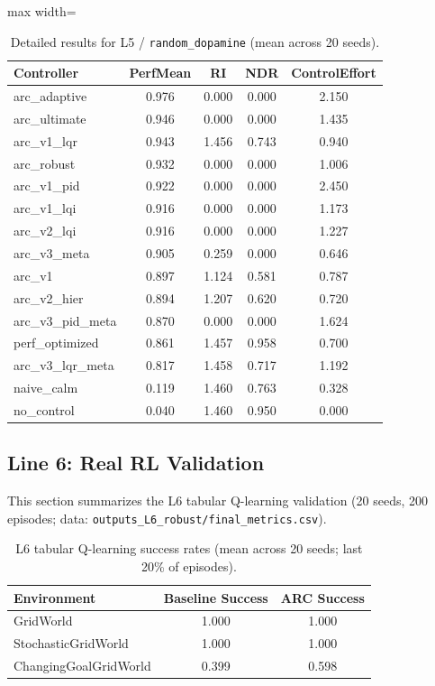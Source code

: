 \documentclass{article}
\begin{document}
\begin{table}[H]
\centering
\footnotesize
\caption{Detailed results for L5 / \texttt{random\_dopamine} (mean across 20 seeds).}
\label{tab:g11_random_dopamine}
\begin{adjustbox}{max width=\textwidth}
\begin{tabular}{@{}lcccc@{}}
\toprule
Controller & PerfMean & RI & NDR & ControlEffort \\ \midrule
arc\_adaptive & 0.976 & 0.000 & 0.000 & 2.150 \\
arc\_ultimate & 0.946 & 0.000 & 0.000 & 1.435 \\
arc\_v1\_lqr & 0.943 & 1.456 & 0.743 & 0.940 \\
arc\_robust & 0.932 & 0.000 & 0.000 & 1.006 \\
arc\_v1\_pid & 0.922 & 0.000 & 0.000 & 2.450 \\
arc\_v1\_lqi & 0.916 & 0.000 & 0.000 & 1.173 \\
arc\_v2\_lqi & 0.916 & 0.000 & 0.000 & 1.227 \\
arc\_v3\_meta & 0.905 & 0.259 & 0.000 & 0.646 \\
arc\_v1 & 0.897 & 1.124 & 0.581 & 0.787 \\
arc\_v2\_hier & 0.894 & 1.207 & 0.620 & 0.720 \\
arc\_v3\_pid\_meta & 0.870 & 0.000 & 0.000 & 1.624 \\
perf\_optimized & 0.861 & 1.457 & 0.958 & 0.700 \\
arc\_v3\_lqr\_meta & 0.817 & 1.458 & 0.717 & 1.192 \\
naive\_calm & 0.119 & 1.460 & 0.763 & 0.328 \\
no\_control & 0.040 & 1.460 & 0.950 & 0.000 \\ \bottomrule
\end{tabular}
\end{adjustbox}
\end{table}

\FloatBarrier
\subsection{Line 6: Real RL Validation}

This section summarizes the L6 tabular Q-learning validation (20 seeds, 200 episodes; data: \texttt{outputs\_L6\_robust/final\_metrics.csv}).

\begin{table}[H]
\centering
\footnotesize
\caption{L6 tabular Q-learning success rates (mean across 20 seeds; last 20\% of episodes).}
\label{tab:g12_l6_success}
\begin{tabular}{@{}lcc@{}}
\toprule
Environment & Baseline Success & ARC Success \\ \midrule
GridWorld & 1.000 & 1.000 \\
StochasticGridWorld & 1.000 & 1.000 \\
ChangingGoalGridWorld & 0.399 & 0.598 \\ \bottomrule
\end{tabular}
\end{table}
\end{document}
